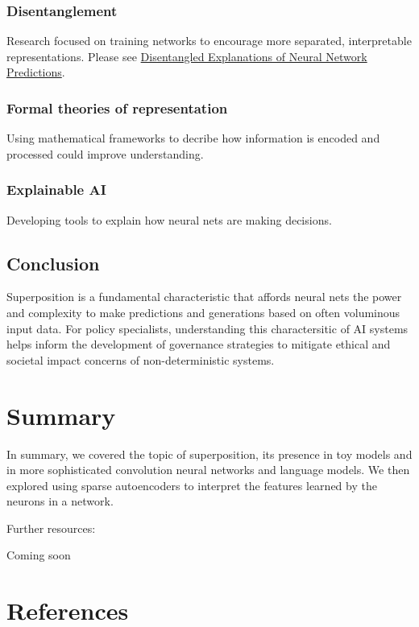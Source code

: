 \documentclass[
  letterpaper,
  DIV=11,
  numbers=noendperiod]{scrreprt}
\newlength{\cslhangindent}
\newenvironment{CSLReferences}[2] %
 {\begin{list}{}{%
  \setlength{\itemindent}{0pt}
  \setlength{\leftmargin}{0pt}
  \setlength{\parsep}{0pt}
  \ifodd #1
   \setlength{\leftmargin}{\cslhangindent}
   \setlength{\itemindent}{-1\cslhangindent}
  \fi
  \setlength{\itemsep}{#2\baselineskip}}}
 {\end{list}}
\begin{document}
\subsection{Disentanglement}\label{disentanglement}

Research focused on training networks to encourage more separated,
interpretable representations. Please see
\href{https://arxiv.org/pdf/2212.14855}{Disentangled Explanations of
Neural Network Predictions}.

\subsection{Formal theories of
representation}\label{formal-theories-of-representation}

Using mathematical frameworks to decribe how information is encoded and
processed could improve understanding.

\subsection{Explainable AI}\label{explainable-ai}

Developing tools to explain how neural nets are making decisions.

\section{Conclusion}\label{conclusion}

Superposition is a fundamental characteristic that affords neural nets
the power and complexity to make predictions and generations based on
often voluminous input data. For policy specialists, understanding this
charactersitic of AI systems helps inform the development of governance
strategies to mitigate ethical and societal impact concerns of
non-deterministic systems.


\chapter{Summary}\label{summary-1}

In summary, we covered the topic of superposition, its presence in toy
models and in more sophisticated convolution neural networks and
language models. We then explored using sparse autoencoders to interpret
the features learned by the neurons in a network.

Further resources:

Coming soon


\chapter*{References}\label{references}


\label{refs}
\begin{CSLReferences}{0}{1}
\end{CSLReferences}
\end{document}
